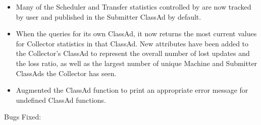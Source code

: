 \begin{itemize}
\item Many of the Scheduler and Transfer statistics controlled by 
are now tracked by user and published in the Submitter ClassAd by default.

\item When the  queries for its own ClassAd, 
it now returns the most current values for Collector statistics in that ClassAd.
New attributes have been added to the Collector's ClassAd
to represent the overall number of lost updates and the loss ratio,
 as well as the largest number of unique Machine
and Submitter ClassAds the Collector has seen.

\item Augmented the ClassAd function  
to print an appropriate error message for undefined ClassAd functions.

\end{itemize}

\noindent Bugs Fixed:

